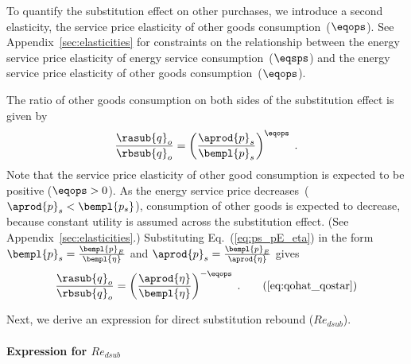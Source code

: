 To quantify the substitution effect on other purchases,
we introduce a second elasticity, 
the service price elasticity of other goods consumption~($\eqops$).
See Appendix~\ref{sec:elasticities} for constraints on the relationship between the
energy service price elasticity of energy service consumption~($\eqsps$) and the
energy service price elasticity of other goods consumption~($\eqops$).

The ratio of other goods consumption on both sides of the substitution effect is given by
%
\begin{equation}
  \frac{\rasub{q}_o}{\rbsub{q}_o} = \left( \frac{\aprod{p}_s}{\bempl{p}_s} \right) ^ {\eqops} \; . 
\end{equation}
%
Note that the service price elasticity of other good consumption
is expected to be positive ($\eqops > 0$).
As the energy service price decreases~($\aprod{p}_s < \bempl{p_s}$), 
consumption of other goods is expected to decrease, 
because constant utility is assumed across the substitution effect.
(See Appendix~\ref{sec:elasticities}.)
Substituting Eq.~(\ref{eq:ps_pE_eta}) in the form
$\bempl{p}_s = \frac{\bempl{p}_E}{\bempl{\eta}}$ and
$\aprod{p}_s = \frac{\bempl{p}_E}{\aprod{\eta}}$
gives
%
\begin{equation}
  \frac{\rasub{q}_o}{\rbsub{q}_o} = \left( \frac{\aprod{\eta}}{\bempl{\eta}} \right) ^ {-\eqops} \; . 
                                                                                              \tag{\ref{eq:qohat_qostar}}
\end{equation}

Next, we derive an expression for direct substitution rebound ($Re_{dsub}$).


\paragraph{Expression for $Re_{dsub}$}
\label{sec:Re_dsub}

